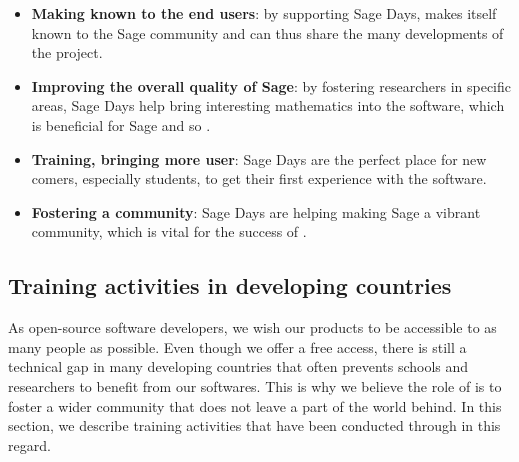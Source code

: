 \documentclass{deliverablereport}
\begin{document}
\begin{itemize}
\item \textbf{Making \ODK known to the end users}: by supporting Sage Days,
\ODK makes itself known to the Sage community and can
thus share the many developments of the project.

\item \textbf{Improving the overall quality of Sage}: by fostering researchers
in specific areas, Sage Days help bring interesting mathematics into
the software, which is beneficial for Sage and so \ODK.

\item \textbf{Training, bringing more user}: Sage Days are the perfect place
for new comers, especially students, to get their first experience with the software.

\item \textbf{Fostering a community}: Sage Days are helping making Sage a vibrant
community, which is vital for the success of \ODK.
\end{itemize}














\subsection{Training activities in developing countries}

As open-source software developers, we wish our products
to be accessible to as many people as possible. Even though we offer
 a free access, there is still a technical gap in many 
developing countries that 
often prevents schools and researchers to benefit from our softwares.
This is why we believe the role of \ODK is to foster 
a wider community that does not leave a part of the world behind. In 
this section, we describe training activities that have been conducted 
through \ODK in this regard.








\end{document}
